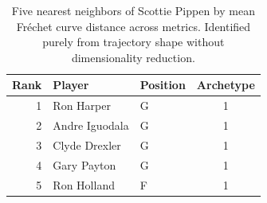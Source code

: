 \begin{table}[htbp]
  \centering\small
  \begin{tabular}{rllc}
    \toprule
    Rank & Player & Position & Archetype \\
    \midrule
    1 & Ron Harper & G & 1 \\
    2 & Andre Iguodala & G & 1 \\
    3 & Clyde Drexler & G & 1 \\
    4 & Gary Payton & G & 1 \\
    5 & Ron Holland & F & 1 \\
    \bottomrule
  \end{tabular}
  \caption{Five nearest neighbors of Scottie Pippen by mean Fr\'{e}chet curve distance across metrics. Identified purely from trajectory shape without dimensionality reduction.}
  \label{tab:Scottie_Pippen_frechet_curve_neighbors}
\end{table}

